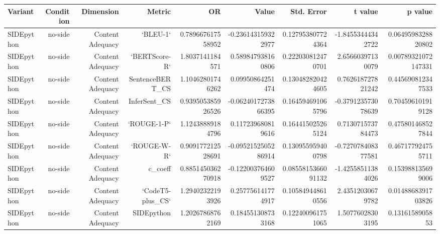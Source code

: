 \begin{tabular}{lrrrrrrrr}
\hline
Variant & Condition & Dimension & Metric & OR & Value & Std. Error & t value & p value
\\
\hline
SIDEpython & no-side & Content Adequacy & `BLEU-1` & 0.789667617558952 & -0.236143159322977 & 0.127953807724364 & -1.84553444342722 & 0.0649598328820802
\\
SIDEpython & no-side & Content Adequacy & `BERTScore-R` & 1.8037141184571 & 0.589847938160806 & 0.222030812470701 & 2.65660397130079 & 0.00789321072147331
\\
SIDEpython & no-side & Content Adequacy & SentenceBERT\_CS & 1.10462801746262 & 0.09950864251474 & 0.130482820424605 & 0.762618727821242 & 0.445690812347533
\\
SIDEpython & no-side & Content Adequacy & InferSent\_CS & 0.939505385926526 & -0.0624017273866395 & 0.164594691065796 & -0.379123573078639 & 0.704596101919128
\\
SIDEpython & no-side & Content Adequacy & `ROUGE-1-P` & 1.12438889184796 & 0.117239680819616 & 0.164415025265124 & 0.713071573784473 & 0.475801468527844
\\
SIDEpython & no-side & Content Adequacy & `ROUGE-W-R` & 0.909177212528691 & -0.0952152505286914 & 0.130955959400798 & -0.727078408377581 & 0.467177924755711
\\
SIDEpython & no-side & Content Adequacy & c\_coeff & 0.885145036270918 & -0.122003764609527 & 0.0855815366091132 & -1.42558511384026 & 0.153988135699006
\\
SIDEpython & no-side & Content Adequacy & `CodeT5-plus\_CS` & 1.29402322193926 & 0.257756141774917 & 0.105849448610556 & 2.43512030679782 & 0.0148868391703826
\\
SIDEpython & no-side & Content Adequacy & SIDEpython & 1.20267868762169 & 0.184551308733168 & 0.122400961751065 & 1.50776028303195 & 0.1316158905853
\\
\hline
\end{tabular}
